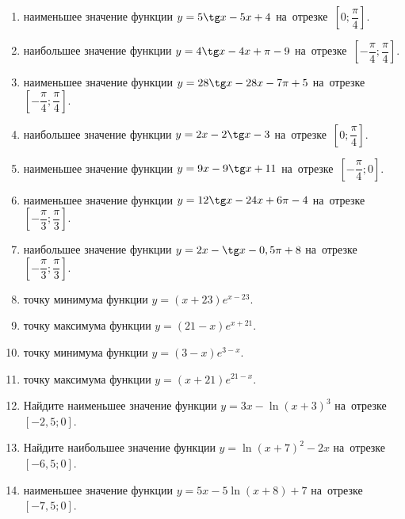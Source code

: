 \documentclass[a4paper,10pt]{article}
\begin{document}
\begin{enumerate}
\item {} наименьшее значение функции $y=5\tg x-5x+4$ на~отрезке~$\left[0;\dfrac{\pi }{4}\right]$.

\item {} наибольшее значение функции $y=4\tg x-4x+\pi -9$ на~отрезке~$\left[-\dfrac{\pi }{4};\dfrac{\pi }{4}\right]$.

\item {} наименьшее значение функции $y=28\tg x-28x-7\pi +5$ на~отрезке~$\left[-\dfrac{\pi }{4};\dfrac{\pi }{4}\right]$.

\item {} наибольшее значение функции $y=2x-2\tg x-3$ на~отрезке~$\left[0;\dfrac{\pi }{4}\right]$.

\item {} наименьшее значение функции $y=9x-9\tg x+11$ на~отрезке~$\left[-\dfrac{\pi }{4};0\right]$.

\item {} наименьшее значение функции $y=12\tg x-24x+6\pi -4$ на~отрезке~$\left[-\dfrac{\pi }{3};\dfrac{\pi }{3}\right]$.

\item {} наибольшее значение функции $y=2x-\tg x-0,5\pi +8$ на~отрезке~$\left[-\dfrac{\pi }{3};\dfrac{\pi }{3}\right]$.

\item {} точку минимума функции $y=\left(x+23\right)e^{x-23}$.

\item {} точку максимума функции $y=\left(21-x\right)e^{x+21}$.

\item {} точку минимума функции $y=\left(3-x\right)e^{3-x}$.

\item {} точку максимума функции $y=\left(x+21\right)e^{21-x}$.

\item Найдите наименьшее значение функции $y=3x-\ln \left(x+3\right)^3$ на~отрезке~$\left[-2,5;0\right]$.

\item Найдите наибольшее значение функции $y=\ln \left(x+7\right)^2-2x$ на~отрезке~$\left[-6,5;0\right]$.

\item {} наименьшее значение функции $y=5x-5\ln \left(x+8\right)+7$ на~отрезке~$\left[-7,5;0\right]$.


\end{enumerate}
\end{document}
